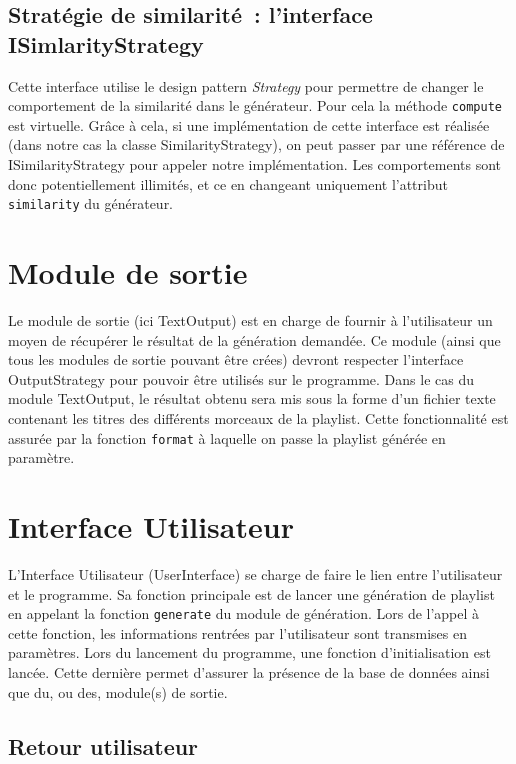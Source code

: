 \subsection{Stratégie de similarité~: l'interface ISimlarityStrategy}
\label{archi:generation:similarity}

Cette interface utilise le design pattern \emph{Strategy} pour permettre de
changer le comportement de la similarité dans le générateur. Pour cela
la méthode \texttt{compute} est virtuelle. Grâce à cela, si une implémentation
de cette interface est réalisée (dans notre cas la classe SimilarityStrategy),
on peut passer par une référence de ISimilarityStrategy pour appeler notre
implémentation. Les comportements sont donc potentiellement illimités, et ce
en changeant uniquement l'attribut \texttt{similarity} du générateur.

\section{Module de sortie}
\label{archi:sortie}

Le module de sortie (ici TextOutput) est en charge de fournir à 
l'utilisateur un moyen de récupérer le résultat de la génération demandée. 
Ce module (ainsi que tous les modules de sortie pouvant être crées) devront 
respecter l'interface OutputStrategy pour pouvoir être utilisés sur le 
programme. Dans le cas du module TextOutput, le résultat obtenu sera mis 
sous la forme d'un fichier texte contenant les titres des différents 
morceaux de la playlist. Cette fonctionnalité est assurée par la fonction 
\texttt{format} à laquelle on passe la playlist générée en paramètre.

\section{Interface Utilisateur}
\label{archi:interface}

L'Interface Utilisateur (UserInterface) se charge de faire le lien entre
l'utilisateur et le programme. Sa fonction principale est de lancer une
génération de playlist en appelant la fonction \texttt{generate} du module de 
génération. Lors de l'appel à cette fonction, les informations rentrées par 
l'utilisateur sont transmises en paramètres. Lors du lancement du programme,
une fonction d'initialisation est lancée. Cette dernière permet d'assurer 
la présence de la base de données ainsi que du, ou des, module(s) de sortie.

\subsection{Retour utilisateur}
\label{archi:interface:feedback}

